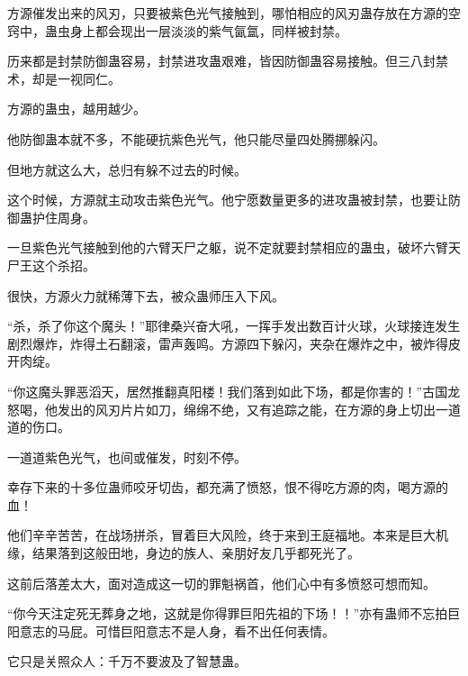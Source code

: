 \begin{this_body}
方源催发出来的风刃，只要被紫色光气接触到，哪怕相应的风刃蛊存放在方源的空窍中，蛊虫身上都会现出一层淡淡的紫气氤氲，同样被封禁。

历来都是封禁防御蛊容易，封禁进攻蛊艰难，皆因防御蛊容易接触。但三八封禁术，却是一视同仁。

方源的蛊虫，越用越少。

他防御蛊本就不多，不能硬抗紫色光气，他只能尽量四处腾挪躲闪。

但地方就这么大，总归有躲不过去的时候。

这个时候，方源就主动攻击紫色光气。他宁愿数量更多的进攻蛊被封禁，也要让防御蛊护住周身。

一旦紫色光气接触到他的六臂天尸之躯，说不定就要封禁相应的蛊虫，破坏六臂天尸王这个杀招。

很快，方源火力就稀薄下去，被众蛊师压入下风。

“杀，杀了你这个魔头！”耶律桑兴奋大吼，一挥手发出数百计火球，火球接连发生剧烈爆炸，炸得土石翻滚，雷声轰鸣。方源四下躲闪，夹杂在爆炸之中，被炸得皮开肉绽。

“你这魔头罪恶滔天，居然推翻真阳楼！我们落到如此下场，都是你害的！”古国龙怒喝，他发出的风刃片片如刀，绵绵不绝，又有追踪之能，在方源的身上切出一道道的伤口。

一道道紫色光气，也间或催发，时刻不停。

幸存下来的十多位蛊师咬牙切齿，都充满了愤怒，恨不得吃方源的肉，喝方源的血！

他们辛辛苦苦，在战场拼杀，冒着巨大风险，终于来到王庭福地。本来是巨大机缘，结果落到这般田地，身边的族人、亲朋好友几乎都死光了。

这前后落差太大，面对造成这一切的罪魁祸首，他们心中有多愤怒可想而知。

“你今天注定死无葬身之地，这就是你得罪巨阳先祖的下场！！”亦有蛊师不忘拍巨阳意志的马屁。可惜巨阳意志不是人身，看不出任何表情。

它只是关照众人：千万不要波及了智慧蛊。

\end{this_body}

